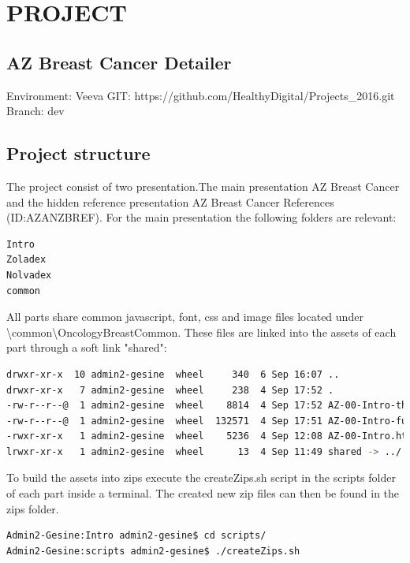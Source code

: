 \section{PROJECT}
\subsection{AZ Breast Cancer Detailer}
Environment: Veeva
GIT:  https://github.com/HealthyDigital/Projects\_2016.git 
Branch: dev

\subsection{Project structure}
The project consist of two presentation.The main presentation AZ Breast Cancer and the hidden reference presentation AZ Breast Cancer References (ID:AZANZBREF). For the main presentation the following folders are relevant:
\begin{lstlisting}[language=sh, caption=Presentation parts,label=lst:folders]
Intro
Zoladex
Nolvadex
common
\end{lstlisting}

All parts share common javascript, font, css and image files located under {{\textbackslash common\textbackslash OncologyBreastCommon}}. These files are linked into the assets of each part through a soft link "shared":

\begin{lstlisting}[language=sh, caption=Soft link,label=lst:softlink]
drwxr-xr-x  10 admin2-gesine  wheel     340  6 Sep 16:07 ..
drwxr-xr-x   7 admin2-gesine  wheel     238  4 Sep 17:52 .
-rw-r--r--@  1 admin2-gesine  wheel    8814  4 Sep 17:52 AZ-00-Intro-thumb.jpg
-rw-r--r--@  1 admin2-gesine  wheel  132571  4 Sep 17:51 AZ-00-Intro-full.jpg
-rwxr-xr-x   1 admin2-gesine  wheel    5236  4 Sep 12:08 AZ-00-Intro.html
lrwxr-xr-x   1 admin2-gesine  wheel      13  4 Sep 11:49 shared -> ../../common/
\end{lstlisting}

To build the assets into zips execute the createZips.sh script in the scripts folder of each part inside a terminal. The created new zip files can then be found in the zips folder. 

\begin{lstlisting}[language=sh, caption=Create asset zips,label=lst:createZips]
Admin2-Gesine:Intro admin2-gesine$ cd scripts/
Admin2-Gesine:scripts admin2-gesine$ ./createZips.sh 
\end{lstlisting}


